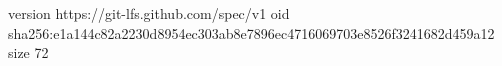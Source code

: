 version https://git-lfs.github.com/spec/v1
oid sha256:e1a144c82a2230d8954ec303ab8e7896ec4716069703e8526f3241682d459a12
size 72
